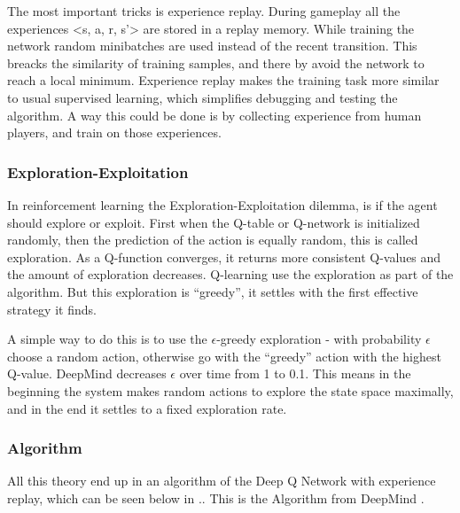 The most important tricks is experience replay. During gameplay all the experiences <s, a, r, s’> are stored in a replay memory. While training the network random minibatches are used instead of the recent transition. This breacks the similarity of training samples, and there by avoid the network to reach a local minimum. Experience replay makes the training task more similar to usual supervised learning, which simplifies debugging and testing the algorithm. A way this could be done is by collecting experience from human players, and train on those experiences.
  
\subsubsection{Exploration-Exploitation}
In reinforcement learning the Exploration-Exploitation dilemma, is if the agent should explore or exploit. First when the Q-table or Q-network is initialized randomly, then the prediction of the action is equally random, this is called exploration. As a Q-function converges, it returns more consistent Q-values and the amount of exploration decreases. Q-learning use the exploration as part of the algorithm. But this exploration is “greedy”, it settles with the first effective strategy it finds.

A simple way to do this is to use the $\epsilon$-greedy exploration - with probability $\epsilon$ choose a random action, otherwise go with the “greedy” action with the highest Q-value. DeepMind decreases $\epsilon$ over time from 1 to 0.1. This means in the beginning the system makes random actions to explore the state space maximally, and in the end it settles to a fixed exploration rate.  

\subsubsection{Algorithm}
All this theory end up in an algorithm of the Deep Q Network with experience replay, which can be seen below in .. This is the Algorithm from DeepMind \cite{DBLP:journals/corr/MnihKSGAWR13}.

